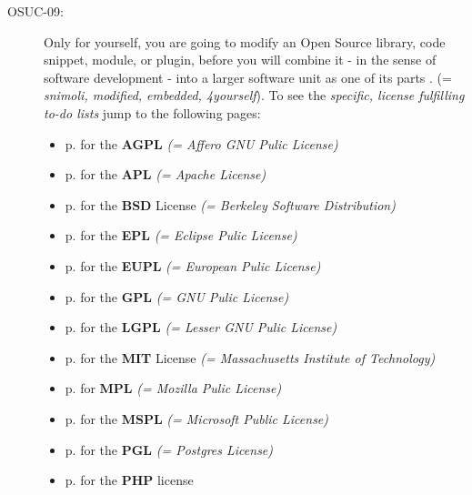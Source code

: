 \begin{description}
\item[OSUC-09:]\label{OSUC-09-DEF} Only for yourself, you are going to modify an
Open Source library, code snippet, module, or plugin, before you will combine it
- in the sense of software development - into a larger software unit as one of
its parts . (= \textit{snimoli, modified, embedded, 4yourself}). 
To see the \textit{specific, license fulfilling to-do lists} jump to the
following pages:
  \begin{itemize}
    \item p. \pageref{OSUC-09-AGPL} for the \textbf{AGPL}
      \textit{(= Affero GNU Pulic License)} 
    \item p. \pageref{OSUC-09-Apache20} for the \textbf{APL}
      \textit{(= Apache License)}
    \item p. \pageref{OSUC-09-BSD} for the \textbf{BSD} License
      \textit{(= Berkeley Software Distribution)}
    \item p. \pageref{OSUC-09-EPL} for the \textbf{EPL}
      \textit{(= Eclipse Pulic License)}     
    \item p. \pageref{OSUC-09-EUPL} for the \textbf{EUPL}
      \textit{(= European Pulic License)} 
    \item p. \pageref{OSUC-09-GPL} for the \textbf{GPL}
       \textit{(= GNU Pulic License)} 
    \item p. \pageref{OSUC-09-LGPL} for the \textbf{LGPL}
      \textit{(= Lesser GNU Pulic License)}           
    \item p. \pageref{OSUC-09-MIT} for the \textbf{MIT} License
       \textit{(= Massachusetts Institute of Technology)} 
    \item p. \pageref{OSUC-09-MPL} for \textbf{MPL}
      \textit{(= Mozilla Pulic License)}     
    \item p. \pageref{OSUC-09-MsPL} for the \textbf{MSPL}
      \textit{(= Microsoft Public License)} 
    \item p. \pageref{OSUC-09-PGL} for the \textbf{PGL}
      \textit{(= Postgres License)} 
    \item p. \pageref{OSUC-09-PHP} for the \textbf{PHP} license 
  \end{itemize}



\end{description}
